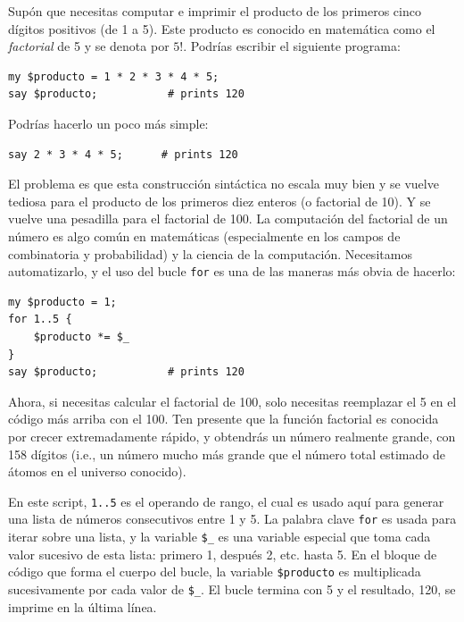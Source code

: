Supón que necesitas computar e imprimir el producto de los 
primeros cinco dígitos positivos (de 1 a 5). Este producto es
conocido en matemática como el \emph{factorial} de 5 y 
se denota por $5!$. Podrías escribir el siguiente programa:  

\begin{lstlisting}
my $producto = 1 * 2 * 3 * 4 * 5;
say $producto;           # prints 120
\end{lstlisting}
%

Podrías hacerlo un poco más simple:
\begin{lstlisting}
say 2 * 3 * 4 * 5;      # prints 120
\end{lstlisting}
%

El problema es que esta construcción sintáctica no 
escala muy bien y se vuelve tediosa para el producto 
de los primeros diez enteros (o factorial de 10). Y
se vuelve una pesadilla para el factorial de 100.
La computación del factorial de un número es algo 
común en matemáticas (especialmente en los campos de 
combinatoria y probabilidad) y la ciencia de la
computación. Necesitamos automatizarlo, y el uso del
bucle {\tt for} es una de las maneras más obvia de hacerlo:

\begin{lstlisting}
my $producto = 1;
for 1..5 {
    $producto *= $_
}
say $producto;           # prints 120
\end{lstlisting}

Ahora, si necesitas calcular el factorial de 100, solo
necesitas reemplazar el 5 en el código más arriba con el 100.
Ten presente que la función factorial es conocida por 
crecer extremadamente rápido, y obtendrás un número
realmente grande, con 158 dígitos (i.e., un número mucho
más grande que el número total estimado de átomos en el
universo conocido).

En este script, {\tt 1..5} es el operando de rango, el cual
es usado aquí para generar una lista de números consecutivos entre 1 y 5.
La palabra clave {\tt for} es usada para iterar sobre una lista, y 
la variable \verb|$_| es una variable especial que toma cada valor sucesivo
de esta lista: primero 1, después 2, etc. hasta 5. En el bloque
de código que forma el cuerpo del bucle, la variable {\tt \$producto}
es multiplicada sucesivamente por cada valor de \verb|$_|. El bucle
termina con 5 y el resultado, 120, se imprime en la última línea.

